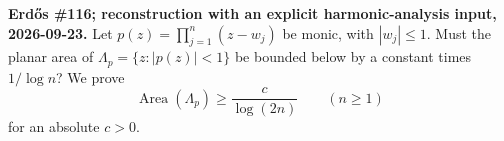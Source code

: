\textbf{Erd\H{o}s \#116; reconstruction with an explicit harmonic-analysis input, 2026-09-23.}
Let $p(z)=\prod_{j=1}^n(z-w_j)$ be monic, with $|w_j|\leq1$. Must the planar area of $\Lambda_p=\{z:|p(z)|<1\}$ be bounded below by a constant times $1/\log n$? We prove
\[
\operatorname{Area}(\Lambda_p)\geq\frac{c}{\log(2n)}\qquad(n\geq1)
\tag{1}
\]
for an absolute $c>0$.

